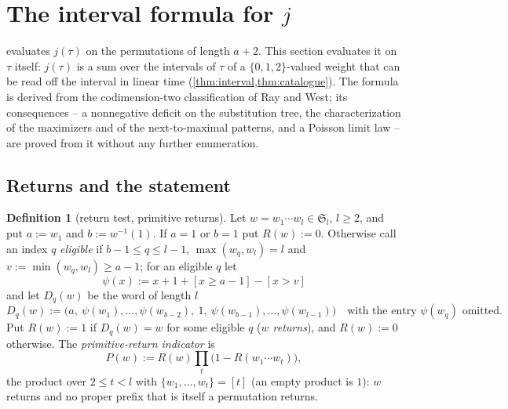 \documentclass[11pt,reqno]{amsart}
\theoremstyle{plain}
\theoremstyle{definition}
\newtheorem{definition}[definition]{Definition}
\theoremstyle{remark}
\newcommand{\Sym}{\mathfrak{S}}
\begin{document}
\section{The interval formula for \texorpdfstring{$j$}{j}}\label{sec:interval}

 evaluates $j(\tau)$ on the permutations of length $a+2$. This section evaluates it on $\tau$ itself: $j(\tau)$ is a sum over the intervals of $\tau$ of a $\{0,1,2\}$-valued weight that can be read off the interval in linear time (\cref{thm:interval,thm:catalogue}). The formula is derived from the codimension-two classification of Ray and West; its consequences -- a nonnegative deficit on the substitution tree, the characterization of the maximizers and of the next-to-maximal patterns, and a Poisson limit law -- are proved from it without any further enumeration.

\subsection{Returns and the statement}

\begin{definition}[return test, primitive returns]\label{def:return}
Let $w=w_1\cdots w_l\in\Sym_l$, $l\ge2$, and put $a:=w_1$ and $b:=w^{-1}(1)$. If $a=1$ or $b=1$ put $R(w):=0$. Otherwise call an index $q$ \emph{eligible} if $b-1\le q\le l-1$, $\max(w_q,w_l)=l$ and $v:=\min(w_q,w_l)\ge a-1$; for an eligible $q$ let
\[
\psi(x):=x+1+[x\ge a-1]-[x>v]
\]
and let $D_q(w)$ be the word of length $l$
\[
D_q(w):=\bigl(a,\ \psi(w_1),\dots,\psi(w_{b-2}),\ 1,\ \psi(w_{b-1}),\dots,\psi(w_{l-1})\bigr)\quad\text{with the entry }\psi(w_q)\text{ omitted}.
\]
Put $R(w):=1$ if $D_q(w)=w$ for some eligible $q$ (\emph{$w$ returns}), and $R(w):=0$ otherwise. The \emph{primitive-return indicator} is
\[
P(w):=R(w)\prod_{t}\bigl(1-R(w_1\cdots w_t)\bigr),
\]
the product over $2\le t<l$ with $\{w_1,\dots,w_t\}=[t]$ (an empty product is $1$): $w$ returns and no proper prefix that is itself a permutation returns.
\end{definition}
\end{document}
